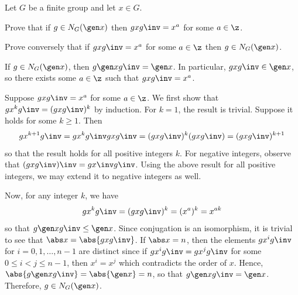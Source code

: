 \begin{exercise}\label{ex2.3.24}
    Let $G$ be a finite group and let $x \in G$.
    \begin{subproblems}
        \item Prove that if $g \in N_G(\gen x)$ then $gxg\inv = x^a$ for some $a \in \z$.
        \item Prove conversely that if $gxg\inv = x^a$ for some $a \in \z$ then $g \in N_G(\gen x)$.
        
    \end{subproblems}
\end{exercise}

\begin{solalph}
    \item If $g \in N_G(\gen x)$, then $g \gen x g\inv = \gen x$. In particular, $gxg\inv \in \gen x$, so there exists some $a \in \z$ such that $gxg\inv = x^a$.
    \item Suppose $gxg\inv = x^a$ for some $a \in \z$. We first show that $gx^kg\inv = (gxg\inv)^k$ by induction. For $k = 1$, the result is trivial. Suppose it holds for some $k \geq 1$. Then
    \[gx^{k + 1}g\inv = gx^kg\inv gxg\inv = (gxg\inv)^k (gxg\inv) = (gxg\inv)^{k + 1}\]
    so that the result holds for all positive integers $k$. For negative integers, observe that $(gxg\inv)\inv = gx\inv g\inv$. Using the above result for all positive integers, we may extend it to negative integers as well.

    Now, for any integer $k$, we have
    \[gx^kg\inv = (gxg\inv)^k = (x^a)^k = x^{ak}\]
    so that $g \gen x g\inv \leq \gen x$. Since conjugation is an isomorphism, it is trivial to see that $\abs x = \abs{gxg\inv}$. If $\abs x = n$, then the elements $gx^ig\inv$ for $i = 0, 1, \ldots, n - 1$ are distinct since if $gx^ig\inv = gx^jg\inv$ for some $0 \leq i < j \leq n - 1$, then $x^i = x^j$ which contradicts the order of $x$. Hence, $\abs{g \gen x g\inv} = \abs{\gen x} = n$, so that $g \gen x g\inv = \gen x$. Therefore, $g \in N_G(\gen x)$.
\end{solalph}

